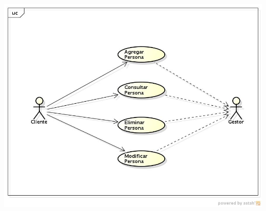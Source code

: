\documentclass[11pt]{article}
\begin{document}
\begin{center}
\includegraphics[scale=0.65]{CasosUsoCliente} 
\end{center}

\end{document}
